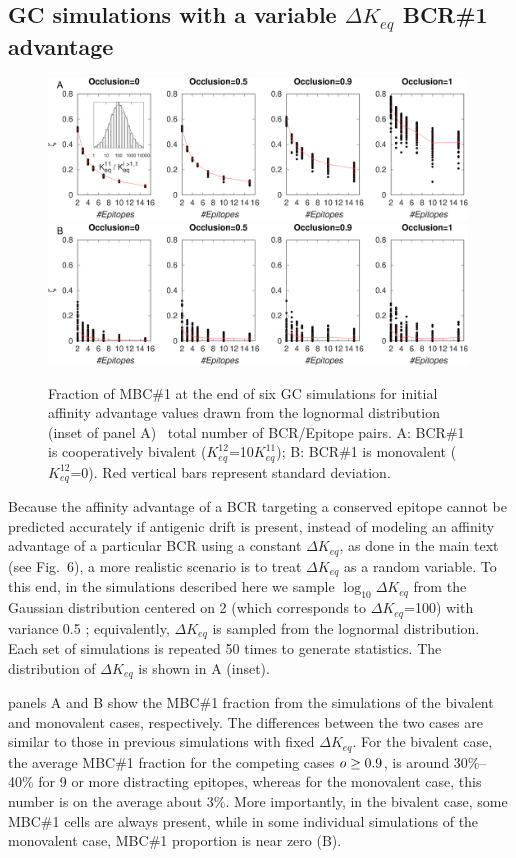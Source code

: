 \subsection{
GC simulations with a variable $\Delta K_{eq}$ BCR\#1 advantage}
\label{sec:fig5}
\begin{figure}
\centering
\includegraphics[width=0.99\textwidth]{../figS4/occl-k12=10rnd.eps}
\includegraphics[width=0.99\textwidth]{../figS4/occl-k12=0rnd.eps}
\caption{Fraction of MBC\#1 at the end of six GC simulations for initial affinity advantage values drawn from the
 lognormal distribution (inset of panel A)
 \vs~total number of BCR/Epitope pairs.
A: BCR\#1 is cooperatively bivalent ($K^{12}_{eq}$=10$K^{11}_{eq}$);
B: BCR\#1 is monovalent ($K^{12}_{eq}$=0).
Red vertical bars represent standard deviation.
}
\label{fig:kadvrand}
\end{figure}
Because the affinity advantage of a BCR targeting a conserved epitope cannot be predicted
accurately if antigenic drift is present, instead of modeling an affinity advantage of a particular BCR using a constant
$\Delta K_{eq}$, as done in the main text (see Fig.~6), a more realistic scenario is
to treat $\Delta K_{eq}$ as a random variable.
To this end, in the simulations described here we sample $\log_{10} \Delta K_{eq}$
from the Gaussian distribution centered on 2 (which corresponds to $\Delta K_{eq}$=100) with variance 0.5
; equivalently, $\Delta K_{eq}$ is sampled from the lognormal distribution.
Each set of simulations is repeated 50 times to
generate statistics. The distribution of $\Delta K_{eq}$ is shown in A (inset).

 panels A and B show the MBC\#1 fraction from the
simulations of the bivalent and monovalent cases, respectively.
The differences between the two cases are similar to those in
previous simulations with fixed $\Delta K_{eq}$. For
the bivalent case, the average MBC\#1 fraction for the competing cases $o\ge
0.9$, is around 30\%--40\% for 9 or more distracting epitopes, whereas
for the monovalent case, this number is on the average about 3\%. More importantly, in the
bivalent case, some MBC\#1 cells are always present, while in some individual simulations
of the monovalent case, MBC\#1 proportion is near zero (B).

